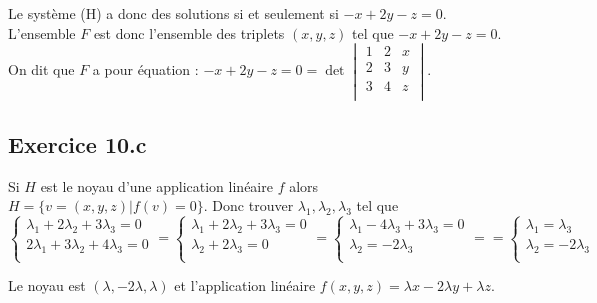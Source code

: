 \documentclass[]{book}
\theoremstyle{definition}
\begin{document}
Le syst\`eme (H) a donc des solutions si et seulement si $-x+2y-z=0$. L'ensemble $F$ est donc l'ensemble des triplets $(x,y,z)$ tel que $-x+2y-z=0$. On dit que $F$ a pour \'equation : $-x+2y-z=0 = \det
\begin{vmatrix}
1 & 2 & x \\
2 & 3 & y \\
3 & 4 & z \\
\end{vmatrix}
$.

\subsection*{Exercice 10.c}
Si $H$ est le noyau d'une application lin\'eaire $f$ alors $H = \{v= (x, y, z) | f(v) = 0\}$.
Donc trouver $\lambda_1, \lambda_2, \lambda_3$ tel que 
$$
\left\{
\begin{array}{l}
\lambda_1 + 2 \lambda_2 + 3 \lambda_3 = 0\\
2\lambda_1 + 3 \lambda_2 + 4\lambda_3  =  0\\
\end{array}
\right.
=
\left\{
\begin{array}{l}
\lambda_1 + 2 \lambda_2 + 3 \lambda_3 = 0\\
 \lambda_2 + 2\lambda_3 = 0\\
\end{array}
\right.
=
\left\{
\begin{array}{l}
\lambda_1 - 4 \lambda_3 + 3 \lambda_3 = 0\\
\lambda_2 = -2\lambda_3 \\
\end{array}
\right.
==
\left\{
\begin{array}{l}
\lambda_1 = \lambda_3\\
\lambda_2 = -2\lambda_3 \\
\end{array}
\right.
$$

Le noyau est $(\lambda, -2 \lambda, \lambda)$ et l'application lin\'eaire $f(x,y,z) = \lambda x - 2 \lambda y + \lambda z$. 	
\end{document}
